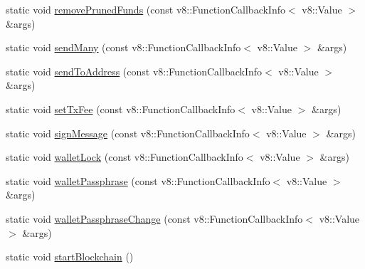\begin{DoxyCompactItemize}
static void \mbox{\hyperlink{class_rad_j_a_v_1_1_blockchain_v1_a4795c4293b56b47ea4c1a0b2a73b209e}{remove\+Pruned\+Funds}} (const v8\+::\+Function\+Callback\+Info$<$ v8\+::\+Value $>$ \&args)
\item 
static void \mbox{\hyperlink{class_rad_j_a_v_1_1_blockchain_v1_a50bb6ba591ff6bdb460df4a988a776e3}{send\+Many}} (const v8\+::\+Function\+Callback\+Info$<$ v8\+::\+Value $>$ \&args)
\item 
static void \mbox{\hyperlink{class_rad_j_a_v_1_1_blockchain_v1_a5735ed5bb0ce82710a99c2be9f821d3c}{send\+To\+Address}} (const v8\+::\+Function\+Callback\+Info$<$ v8\+::\+Value $>$ \&args)
\item 
static void \mbox{\hyperlink{class_rad_j_a_v_1_1_blockchain_v1_ac95f9d5eb733c2c73a55e2c38d411b2f}{set\+Tx\+Fee}} (const v8\+::\+Function\+Callback\+Info$<$ v8\+::\+Value $>$ \&args)
\item 
static void \mbox{\hyperlink{class_rad_j_a_v_1_1_blockchain_v1_a434f78b2951ad2f6f87dcf3f906929fd}{sign\+Message}} (const v8\+::\+Function\+Callback\+Info$<$ v8\+::\+Value $>$ \&args)
\item 
static void \mbox{\hyperlink{class_rad_j_a_v_1_1_blockchain_v1_a241c87233e4035531a06226b4230f41f}{wallet\+Lock}} (const v8\+::\+Function\+Callback\+Info$<$ v8\+::\+Value $>$ \&args)
\item 
static void \mbox{\hyperlink{class_rad_j_a_v_1_1_blockchain_v1_ad39b7d8c156b9ffb9b03618e1855e1f2}{wallet\+Passphrase}} (const v8\+::\+Function\+Callback\+Info$<$ v8\+::\+Value $>$ \&args)
\item 
static void \mbox{\hyperlink{class_rad_j_a_v_1_1_blockchain_v1_adc01c31ae423fb7fc11f357d687003e4}{wallet\+Passphrase\+Change}} (const v8\+::\+Function\+Callback\+Info$<$ v8\+::\+Value $>$ \&args)
\item 
static void \mbox{\hyperlink{class_rad_j_a_v_1_1_blockchain_v1_a714b13772016aa5df534a1112cfc5cfb}{start\+Blockchain}} ()
\end{DoxyCompactItemize}
